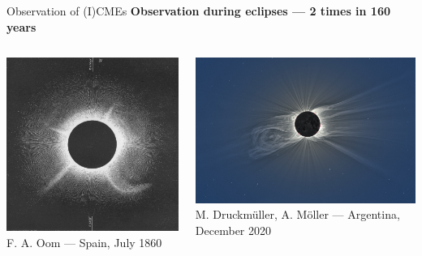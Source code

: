 \documentclass[10pt,aspectratio=169,usenames,dvipsnames]{beamer}
\begin{document}
\begin{frame}{Observation of (I)CMEs}
\centering
\textbf{Observation during eclipses --- 2 times in 160 years}
\vskip2mm
\begin{columns}
	\begin{column}{0.35\textwidth}
		\centering
		\includegraphics[width=\textwidth]{../images/oldcme3.png}\\
		F. A. Oom --- Spain, July 1860
	\end{column}
	\begin{column}{0.6\textwidth}
		\centering
		\includegraphics[width=\textwidth]{images/druckmueller_2020_eclipse_enhanced.png}\\
		M. Druckmüller, A. Möller --- Argentina, December 2020
	\end{column}
\end{columns}
\end{frame}
\end{document}
